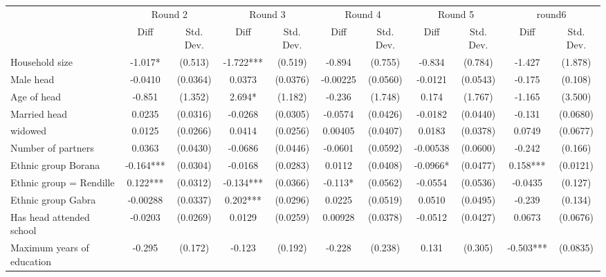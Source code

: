 \begin{tabular}{l*{5}{cc}}
\toprule
            &\multicolumn{2}{c}{Round 2} &\multicolumn{2}{c}{Round 3} &\multicolumn{2}{c}{Round 4} &\multicolumn{2}{c}{Round 5} &\multicolumn{2}{c}{round6}  \\
            &        Diff   &   Std. Dev.&        Diff   &   Std. Dev.&        Diff   &   Std. Dev.&        Diff   &   Std. Dev.&        Diff   &   Std. Dev.\\
\midrule
Household size&      -1.017*  &     (0.513)&      -1.722***&     (0.519)&      -0.894   &     (0.755)&      -0.834   &     (0.784)&      -1.427   &     (1.878)\\
Male head   &     -0.0410   &    (0.0364)&      0.0373   &    (0.0376)&    -0.00225   &    (0.0560)&     -0.0121   &    (0.0543)&      -0.175   &     (0.108)\\
Age of head &      -0.851   &     (1.352)&       2.694*  &     (1.182)&      -0.236   &     (1.748)&       0.174   &     (1.767)&      -1.165   &     (3.500)\\
Married head&      0.0235   &    (0.0316)&     -0.0268   &    (0.0305)&     -0.0574   &    (0.0426)&     -0.0182   &    (0.0440)&      -0.131   &    (0.0680)\\
widowed     &      0.0125   &    (0.0266)&      0.0414   &    (0.0256)&     0.00405   &    (0.0407)&      0.0183   &    (0.0378)&      0.0749   &    (0.0677)\\
Number of partners&      0.0363   &    (0.0430)&     -0.0686   &    (0.0446)&     -0.0601   &    (0.0592)&    -0.00538   &    (0.0600)&      -0.242   &     (0.166)\\
Ethnic group Borana&      -0.164***&    (0.0304)&     -0.0168   &    (0.0283)&      0.0112   &    (0.0408)&     -0.0966*  &    (0.0477)&       0.158***&    (0.0121)\\
Ethnic group = Rendille &       0.122***&    (0.0312)&      -0.134***&    (0.0366)&      -0.113*  &    (0.0562)&     -0.0554   &    (0.0536)&     -0.0435   &     (0.127)\\
Ethnic group Gabra&    -0.00288   &    (0.0337)&       0.202***&    (0.0296)&      0.0225   &    (0.0519)&      0.0510   &    (0.0495)&      -0.239   &     (0.134)\\
Has head attended school&     -0.0203   &    (0.0269)&      0.0129   &    (0.0259)&     0.00928   &    (0.0378)&     -0.0512   &    (0.0427)&      0.0673   &    (0.0676)\\
Maximum years of education&      -0.295   &     (0.172)&      -0.123   &     (0.192)&      -0.228   &     (0.238)&       0.131   &     (0.305)&      -0.503***&    (0.0835)\\

\end{tabular}
